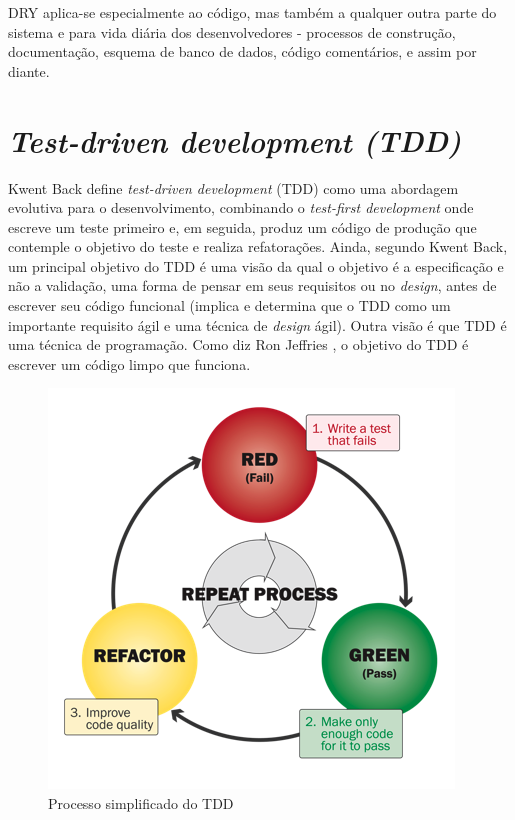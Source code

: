 \documentclass[12pt]{article}
\begin{document}
DRY aplica-se especialmente ao código, mas também a qualquer outra parte do sistema e para vida diária dos desenvolvedores - processos de construção, documentação, esquema de banco de dados, código comentários, e assim por diante.

\section{\textsl{Test-driven development (TDD)}} \label{sec:tdd}

Kwent Back \cite{TDD_EXAMPLE} define \textit{test-driven development} (TDD) como uma abordagem evolutiva para o desenvolvimento, combinando o \textit{test-first development } onde escreve um teste primeiro e, em seguida, produz um código de produção que contemple o objetivo do teste e realiza refatorações. Ainda, segundo Kwent Back\cite{TDD_EXAMPLE}, um principal objetivo do TDD é uma visão da qual o objetivo é a especificação e não a validação, uma forma de pensar em seus requisitos ou no \textit{design}, antes de escrever seu código funcional (implica e determina que o TDD como um importante requisito ágil e uma técnica de \textit{design} ágil). Outra visão é que TDD é uma técnica de programação. Como diz Ron Jeffries \cite{CLEAN_CODE_TOO_MUCH_OF_A_GOOD_THING}, o objetivo do TDD é escrever um código limpo que funciona.


\begin{figure}[h]
	\centering
		\includegraphics[scale=0.4]{img/tdd-simple-process.png}
	\caption{Processo simplificado do TDD}
	\label{fig:TDD-PROCESS}
\end{figure}
\end{document}
